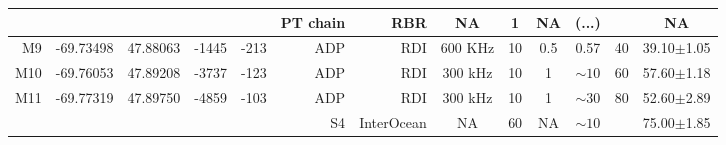 \documentclass[letterpaper,10pt,landscape]{article}
\begin{document}
\begin{table}
\begin{tabular}{|r|c|c|r|r|r|r|c|c|c|c|c|c|}
    ~                   &                            &                           &                        &                       & PT chain     & RBR        & NA        & 1         & NA       & (...)      &                    &  NA               \\\hline
    M9                  & -69.73498                  & 47.88063                  & -1445                  & -213                  & ADP          & RDI        & 600 KHz   & 10        & 0.5      & 0.57       & 40                 &  39.10$\pm$1.05   \\\hline
    M10                 & -69.76053                  & 47.89208                  & -3737                  & -123                  & ADP          & RDI        & 300 kHz   & 10        & 1        & $\sim10$   & 60                 &  57.60$\pm$1.18   \\\hline
    \multirow{2}{*}{M11}& \multirow{2}{*}{-69.77319} & \multirow{2}{*}{47.89750} & \multirow{2}{*}{-4859} & \multirow{2}{*}{-103} & ADP          & RDI        & 300 kHz   & 10        & 1        & $\sim30$   & \multirow{2}{*}{80}&  52.60$\pm$2.89   \\
    ~                   &                            &                           &                        &                       & S4           & InterOcean & NA        & 60        & NA       & $\sim10$   &                    &  75.00$\pm$1.85   \\\hline
 \end{tabular}
  

\end{table}
\end{document}
